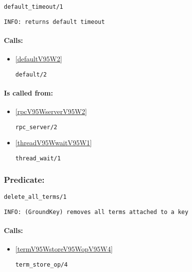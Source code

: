 \begin{verbatim}
default_timeout/1
\end{verbatim}

{\small \begin{verbatim}
INFO: returns default timeout

\end{verbatim}}
\paragraph{Calls:} 
\begin{itemize}
\item \ref{defaultV95W2} 
\begin{verbatim}
default/2
\end{verbatim}

\end{itemize}
\paragraph{Is called from:} 
\begin{itemize}
\item \ref{rpcV95WserverV95W2} 
\begin{verbatim}
rpc_server/2
\end{verbatim}

\item \ref{threadV95WwaitV95W1} 
\begin{verbatim}
thread_wait/1
\end{verbatim}

\end{itemize}

\subsubsection{Predicate:} \label{deleteV95WallV95WtermsV95W1}

\begin{verbatim}
delete_all_terms/1
\end{verbatim}

{\small \begin{verbatim}
INFO: (GroundKey) removes all terms attached to a key

\end{verbatim}}
\paragraph{Calls:} 
\begin{itemize}
\item \ref{termV95WstoreV95WopV95W4} 
\begin{verbatim}
term_store_op/4
\end{verbatim}

\end{itemize}

